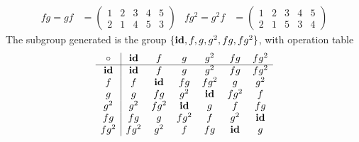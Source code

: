 \documentclass{article}
\begin{document}
\begin{align*}
    fg = gf     & = \begin{pmatrix}
                        1 & 2 & 3 & 4 & 5 \\
                        2 & 1 & 4 & 5 & 3
                    \end{pmatrix} &
    fg^2 = g^2f & = \begin{pmatrix}
                        1 & 2 & 3 & 4 & 5 \\
                        2 & 1 & 5 & 3 & 4
                    \end{pmatrix}
\end{align*}
The subgroup generated is the group $\{\operatorname{\textbf{id}},f,g,g^2,fg,fg^2\}$, with operation table
\[
    \begin{array}{c|cccccc}
        \circ & \operatorname{\textbf{id}}  & f    & g    & g^2  & fg   & fg^2 \\
        \hline
        \operatorname{\textbf{id}}   & \operatorname{\textbf{id}}  & f    & g    & g^2  & fg   & fg^2 \\
        f     & f    & \operatorname{\textbf{id}}  & fg   & fg^2 & g    & g^2  \\
        g     & g    & fg   & g^2  & \operatorname{\textbf{id}}  & fg^2 & f    \\
        g^2   & g^2  & fg^2 & \operatorname{\textbf{id}}  & g    & f    & fg   \\
        fg    & fg   & g    & fg^2 & f    & g^2  & \operatorname{\textbf{id}}  \\
        fg^2  & fg^2 & g^2  & f    & fg   & \operatorname{\textbf{id}}  & g
    \end{array}
\]
\qdash
\end{document}

